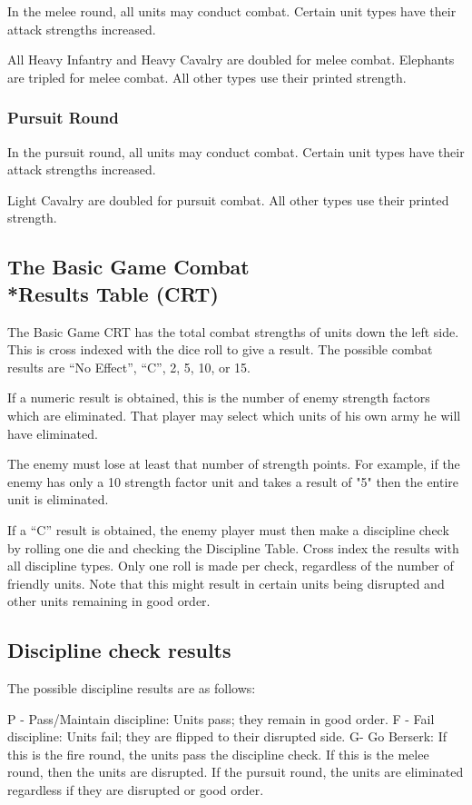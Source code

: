 In the melee round, all units may conduct combat. Certain unit types have their attack strengths increased.

All Heavy Infantry and Heavy Cavalry are doubled for melee combat. Elephants are tripled for melee combat. All other types use their printed strength.

\subsubsection{Pursuit Round}

In the pursuit round, all units may conduct combat. Certain unit types have their attack strengths increased.

Light Cavalry are doubled for pursuit combat. All other types use their printed strength.

\subsection{The Basic Game Combat\\*Results Table (CRT)}

The Basic Game CRT has the total combat strengths of units down the left side. This is cross indexed with the dice roll to give a result. The possible combat results are “No Effect”, “C”, 2, 5, 10, or 15.

If a numeric result is obtained, this is the number of enemy strength factors which are eliminated. That player may select which units of his own army he will have eliminated.

The enemy must lose at least that number of strength points. For example, if the enemy has only a 10 strength factor unit and takes a result of "5" then the entire unit is eliminated.

If a “C” result is obtained, the enemy player must then make a discipline check by rolling one die and checking the Discipline Table. Cross index the results with all discipline types. Only one roll is made per check, regardless of the number of friendly units. Note that this might result in certain units being disrupted and other units remaining in good order.

\subsection{Discipline check results}

The possible discipline results are as follows:

P - Pass/Maintain discipline: Units pass; they remain in good order.
F - Fail discipline: Units fail; they are flipped to their disrupted side.
G- Go Berserk: If this is the fire round, the units pass the discipline check. If this is the melee round, then the units are disrupted. If the pursuit round, the units are eliminated regardless if they are disrupted or good order.

